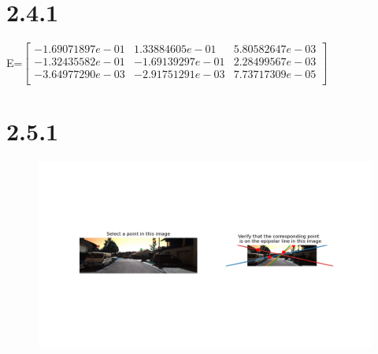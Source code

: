 \documentclass{article}
\begin{document}
    \section*{2.4.1}

    E=$\begin{bmatrix}
        -1.69071897e-01 &  1.33884605e-01 &  5.80582647e-03\\
        -1.32435582e-01 & -1.69139297e-01 &  2.28499567e-03\\
        -3.64977290e-03 & -2.91751291e-03 &  7.73717309e-05\\
    \end{bmatrix}$\\
    \section*{2.5.1}
    \begin{figure}[H]
        \centering
              \includegraphics[width=0.9\linewidth]{../homework/2_5_1_epipolarMatchGUI.png}
    \end{figure}
    
\end{document}
